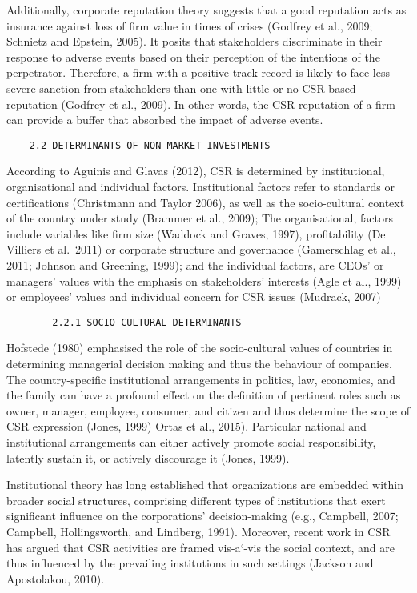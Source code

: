 \documentclass[
]{mitthesis}
\begin{document}
Additionally, corporate reputation theory suggests that a good reputation acts as insurance against loss of firm value in times of crises (Godfrey et al., 2009; Schnietz and Epstein, 2005). It posits that stakeholders discriminate in their response to adverse events based on their perception of the intentions of the perpetrator. Therefore, a firm with a positive track record is likely to face less severe sanction from stakeholders than one with little or no CSR based reputation (Godfrey et al., 2009). In other words, the CSR reputation of a firm can provide a buffer that absorbed the impact of adverse events.

\begin{verbatim}
    2.2 DETERMINANTS OF NON MARKET INVESTMENTS
\end{verbatim}

According to Aguinis and Glavas (2012), CSR is determined by institutional, organisational and individual factors. Institutional factors refer to standards or certifications (Christmann and Taylor 2006), as well as the socio-cultural context of the country under study (Brammer et al., 2009); The organisational, factors include variables like firm size (Waddock and Graves, 1997), profitability (De Villiers et al.~2011) or corporate structure and governance (Gamerschlag et al., 2011; Johnson and Greening, 1999); and the individual factors, are CEOs' or managers' values with the emphasis on stakeholders' interests (Agle et al., 1999) or employees' values and individual concern for CSR issues (Mudrack, 2007)

\begin{verbatim}
        2.2.1 SOCIO-CULTURAL DETERMINANTS
\end{verbatim}

Hofstede (1980) emphasised the role of the socio-cultural values of countries in determining managerial decision making and thus the behaviour of companies. The country-specific institutional arrangements in politics, law, economics, and the family can have a profound effect on the definition of pertinent roles such as owner, manager, employee, consumer, and citizen and thus determine the scope of CSR expression (Jones, 1999) Ortas et al., 2015). Particular national and institutional arrangements can either actively promote social responsibility, latently sustain it, or actively discourage it (Jones, 1999).

Institutional theory has long established that organizations are embedded within broader social structures, comprising different types of institutions that exert significant influence on the corporations' decision-making (e.g., Campbell, 2007; Campbell, Hollingsworth, and Lindberg, 1991). Moreover, recent work in CSR has argued that CSR activities are framed vis-a`-vis the social context, and are thus influenced by the prevailing institutions in such settings (Jackson and Apostolakou, 2010).
\end{document}
